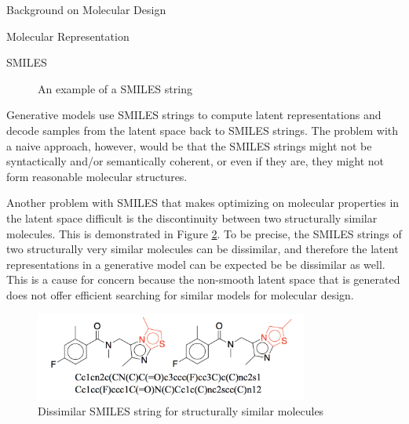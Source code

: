 \documentclass{article}
\begin{document}
\begin{psection}{Background on Molecular Design}
\begin{psubsection}{Molecular Representation}
\begin{pssubsection}{SMILES}
			\begin{figure}[htpb]
				\centering
				\hspace{0cm}
				\caption{An example of a SMILES string}
				\label{fig:smiles}
			\end{figure}

			Generative models use SMILES strings to compute latent representations and decode samples from the latent space back to SMILES strings. The problem with a naive approach, however, would be that the SMILES strings might not be syntactically and/or semantically coherent, or even if they are, they might not form reasonable molecular structures.

			Another problem with SMILES that makes optimizing on molecular properties in the latent space difficult is the discontinuity between two structurally similar molecules. This is demonstrated in Figure \ref{fig:smiles-problem}. To be precise, the SMILES strings of two structurally very similar molecules can be dissimilar, and therefore the latent representations in a generative model can be expected be be dissimilar as well. This is a cause for concern because the non-smooth latent space that is generated does not offer efficient searching for similar models for molecular design.

			\begin{figure}[htpb]
				\centering
				\includegraphics[width=0.8\textwidth]{includes/smiles-problem.png}
				\caption{Dissimilar SMILES string for structurally similar molecules}
				\label{fig:smiles-problem}
			\end{figure}


\end{pssubsection}
\end{psubsection}
\end{psection}
\end{document}
